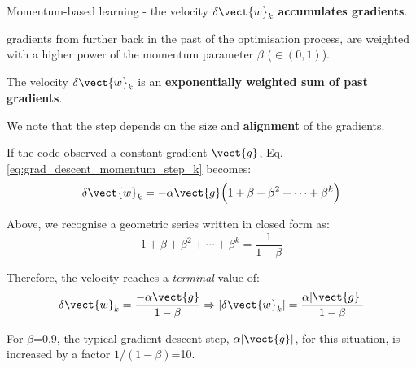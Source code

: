 \begin{frame}[t,allowframebreaks]{
    Momentum-based learning -}
    the \gls{velocity} 
    $\delta \vect{w}_{k}$ {\bf accumulates \glspl{gradient}}.

    \vspace{0.2cm}

    \Glspl{gradient} from further back in the past of the 
    \gls{optimisation} process, 
    are weighted with a higher power of 
    the \gls{momentum parameter} 
    $\beta$ ($\in (0,1)$).

    \vspace{0.2cm}

    The \gls{velocity} $\delta \vect{w}_{k}$ is an 
    {\bf exponentially weighted sum of past gradients}.

    \framebreak


    We note that the step depends on the size 
    and {\bf alignment} of the gradients.\\
    \vspace{0.2cm}

    If the code observed a constant gradient $\vect{g}$, 
    Eq. \ref{eq:grad_descent_momentum_step_k} becomes:\\
    \begin{equation}
        \delta \vect{w}_{k} = 
            -\alpha \vect{g} \Big(
               1 + \beta + \beta^2 + \cdots + \beta^k
            \Big)
    \end{equation}

    Above, we recognise a geometric series 
    written in closed form as:\\
    \begin{equation}
        1 + \beta + \beta^2 + \cdots + \beta^k = \frac{1}{1-\beta}
    \end{equation}

    Therefore, the velocity reaches a {\em terminal} value of:\\
    \begin{equation}
        \delta \vect{w}_{k} = 
            \frac{-\alpha \vect{g}}{1-\beta} \Rightarrow
        |\delta \vect{w}_{k}| = 
            \frac{\alpha |\vect{g}|}{1-\beta} 
    \end{equation}

    \vspace{0.1cm}

    For $\beta$=0.9, 
    the typical gradient descent step, $\alpha |\vect{g}|$,
    for this situation,
    is increased by a factor $1/(1-\beta)$=10.\\

\end{frame}

